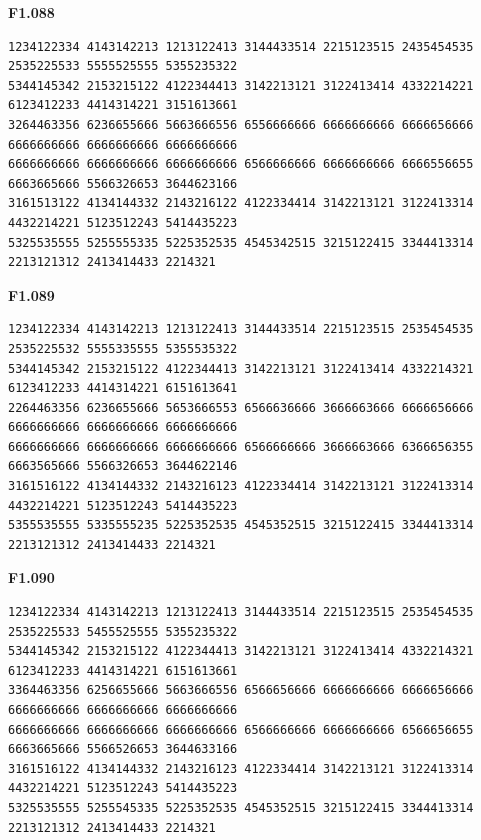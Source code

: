 \noindent\begin{minipage}{\linewidth}\textbf{F1.088}
\begin{lstlisting}
1234122334 4143142213 1213122413 3144433514 2215123515 2435454535 2535225533 5555525555 5355235322
5344145342 2153215122 4122344413 3142213121 3122413414 4332214221 6123412233 4414314221 3151613661
3264463356 6236655666 5663666556 6556666666 6666666666 6666656666 6666666666 6666666666 6666666666
6666666666 6666666666 6666666666 6566666666 6666666666 6666556655 6663665666 5566326653 3644623166
3161513122 4134144332 2143216122 4122334414 3142213121 3122413314 4432214221 5123512243 5414435223
5325535555 5255555335 5225352535 4545342515 3215122415 3344413314 2213121312 2413414433 2214321
\end{lstlisting}
\end{minipage}\par\smallskip

\noindent\begin{minipage}{\linewidth}\textbf{F1.089}
\begin{lstlisting}
1234122334 4143142213 1213122413 3144433514 2215123515 2535454535 2535225532 5555335555 5355535322
5344145342 2153215122 4122344413 3142213121 3122413414 4332214321 6123412233 4414314221 6151613641
2264463356 6236655666 5653666553 6566636666 3666663666 6666656666 6666666666 6666666666 6666666666
6666666666 6666666666 6666666666 6566666666 3666663666 6366656355 6663565666 5566326653 3644622146
3161516122 4134144332 2143216123 4122334414 3142213121 3122413314 4432214221 5123512243 5414435223
5355535555 5335555235 5225352535 4545352515 3215122415 3344413314 2213121312 2413414433 2214321
\end{lstlisting}
\end{minipage}\par\smallskip

\noindent\begin{minipage}{\linewidth}\textbf{F1.090}
\begin{lstlisting}
1234122334 4143142213 1213122413 3144433514 2215123515 2535454535 2535225533 5455525555 5355235322
5344145342 2153215122 4122344413 3142213121 3122413414 4332214321 6123412233 4414314221 6151613661
3364463356 6256655666 5663666556 6566656666 6666666666 6666656666 6666666666 6666666666 6666666666
6666666666 6666666666 6666666666 6566666666 6666666666 6566656655 6663665666 5566526653 3644633166
3161516122 4134144332 2143216123 4122334414 3142213121 3122413314 4432214221 5123512243 5414435223
5325535555 5255545335 5225352535 4545352515 3215122415 3344413314 2213121312 2413414433 2214321
\end{lstlisting}
\end{minipage}\par\smallskip

